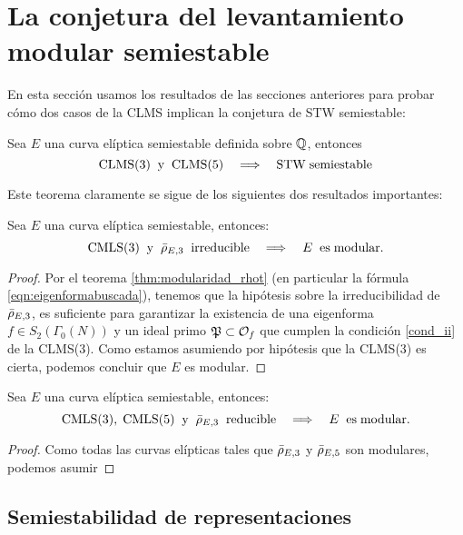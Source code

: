 \section{La conjetura del levantamiento modular semiestable}

En esta secci\'on usamos los resultados de las secciones anteriores para probar 
c\'omo dos casos de la CLMS implican la conjetura de STW semiestable:

\begin{thm}
  Sea $E$ una curva el\'iptica semiestable definida sobre $\mathbb{Q}$, entonces
  \[
    \mathrm{CLMS}(3) \;\; \mathrm{y}\;\; \mathrm{CLMS}(5)
    \quad\Longrightarrow\quad \mathrm{STW}\;\mathrm{semiestable}
  \]
\end{thm}

Este teorema claramente se sigue de los siguientes dos resultados importantes:

\begin{prop}
  Sea $E$ una curva el\'iptica semiestable, entonces:
  \[
    \mathrm{CMLS}(3)\;\;\mathrm{y}\;\; \bar{\rho}_{E,3}\;\;\mathrm{irreducible}\quad\Longrightarrow\quad
    E \;\;\mathrm{es}\;\mathrm{modular.}
  \]
\end{prop}

\begin{proof}
  Por el teorema \ref{thm:modularidad_rhot} (en particular la f\'ormula \ref{eqn:eigenformabuscada}),
  tenemos que la hip\'otesis sobre la irreducibilidad de $\bar{\rho}_{E,3}$, es suficiente para garantizar
  la existencia de una eigenforma $f\in S_2(\Gamma_0(N))$ y un ideal primo $\mathfrak{P}\subset\mathcal{O}_f$ que
  cumplen la condici\'on \ref{cond_ii} de la CLMS(3). Como estamos asumiendo por hip\'otesis que
  la CLMS(3) es cierta, podemos concluir que $E$ es modular.
\end{proof}

\begin{prop}
  Sea $E$ una curva el\'iptica semiestable, entonces:
  \[
    \mathrm{CMLS}(3),\;\mathrm{CMLS}(5) \;\;\mathrm{y}\;\; \bar{\rho}_{E,3}\;\;\mathrm{reducible}\quad\Longrightarrow\quad
    E \;\;\mathrm{es}\;\mathrm{modular.}
  \]
\end{prop}

\begin{proof}
  Como todas las curvas el\'ipticas tales que $\bar{\rho}_{E,3}$ y $\bar{\rho}_{E,5}$ son modulares, podemos asumir 
\end{proof}

\subsection{Semiestabilidad de representaciones}%

